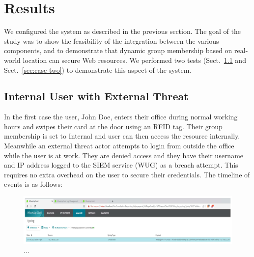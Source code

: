 \section{Results}\label{sec:results}

We configured the system as described in the previous section.  The
goal of the study was to show the feasibility of the integration
between the various components, and to demonstrate that dynamic group
membership based on real-world location can secure Web resources.  We
performed two tests (Sect.~\ref{sec:case-one} and
Sect.~\ref{sec:case-two}) to demonstrate this aspect of the system.

\subsection{Internal User with External Threat}\label{sec:case-one}

In the first case the user, John Doe, enters their office during
normal working hours and swipes their card at the door using an RFID
tag.  Their group membership is set to Internal and user can then
access the resource internally.  Meanwhile an external threat actor
attempts to login from outside the office while the user is at work.
They are denied access and they have their username and IP address
logged to the SIEM service (WUG) as a breach attempt.  This requires
no extra overhead on the user to secure their credentials.  The
timeline of events is as follows:

\begin{figure}
  \centerline{\includegraphics[width=\textwidth]{img/whatsup-gold-alert}}
  \caption{...}\label{fig:whatsup-gold-alert}
\end{figure}

